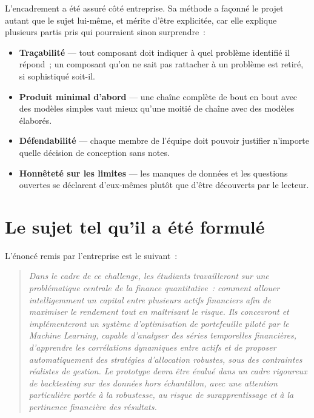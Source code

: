 L'encadrement a été assuré côté entreprise. Sa méthode a façonné le projet autant
que le sujet lui-même, et mérite d'être explicitée, car elle explique plusieurs
partis pris qui pourraient sinon surprendre~:

\begin{itemize}
  \item \textbf{Traçabilité} — tout composant doit indiquer à quel problème
        identifié il répond~; un composant qu'on ne sait pas rattacher à un
        problème est retiré, si sophistiqué soit-il.
  \item \textbf{Produit minimal d'abord} — une chaîne complète de bout en bout
        avec des modèles simples vaut mieux qu'une moitié de chaîne avec des
        modèles élaborés.
  \item \textbf{Défendabilité} — chaque membre de l'équipe doit pouvoir
        justifier n'importe quelle décision de conception sans notes.
  \item \textbf{Honnêteté sur les limites} — les manques de données et les
        questions ouvertes se déclarent d'eux-mêmes plutôt que d'être
        découverts par le lecteur.
\end{itemize}

\section{Le sujet tel qu'il a été formulé}

L'énoncé remis par l'entreprise est le suivant~:

\begin{quote}\small\itshape
Dans le cadre de ce challenge, les étudiants travailleront sur une problématique
centrale de la finance quantitative~: comment allouer intelligemment un capital
entre plusieurs actifs financiers afin de maximiser le rendement tout en
maîtrisant le risque. Ils concevront et implémenteront un système d'optimisation
de portefeuille piloté par le \emph{Machine Learning}, capable d'analyser des
séries temporelles financières, d'apprendre les corrélations dynamiques entre
actifs et de proposer automatiquement des stratégies d'allocation robustes, sous
des contraintes réalistes de gestion. Le prototype devra être évalué dans un
cadre rigoureux de \emph{backtesting} sur des données hors échantillon, avec une
attention particulière portée à la robustesse, au risque de surapprentissage et à
la pertinence financière des résultats.
\end{quote}

